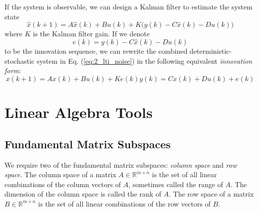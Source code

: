 If the system is observable, we can design a Kalman filter to estimate the system state \cite{kalman1960new}
\begin{equation*}
\hat{x}(k+1) = A\hat{x}(k) + Bu(k) + K\big(y(k) - C\hat{x}(k) - Du(k)\big)
\end{equation*}
where $K$ is the Kalman filter gain. If we denote 
\begin{equation*}
e(k) = y(k) - C\hat{x}(k) - Du(k)
\end{equation*}
to be the innovation sequence, we can rewrite the combined deterministic-stochastic system in Eq. (\ref{eq:2_lti_noise}) in the following equivalent \textit{innovation form}:
\begin{subequations}\label{eq:2_innovation}
\begin{equation}x(k+1) = Ax(k) + Bu(k) + Ke(k)\end{equation}
\begin{equation}y(k) = Cx(k) + Du(k) + e(k)\end{equation}
\end{subequations}

\section{Linear Algebra Tools}

\subsection{Fundamental Matrix Subspaces}
We require two of the fundamental matrix subspaces: \textit{column space} and \textit{row space}. The column space of a matrix $A \in \mathbb{R}^{m\times n}$ is the set of all linear combinations of the column vectors of $A$, sometimes called the range of $A$. The dimension of the column space is called the rank of $A$. The row space of a matrix $B \in \mathbb{R}^{m\times n}$ is the set of all linear combinations of the row vectors of $B$.


